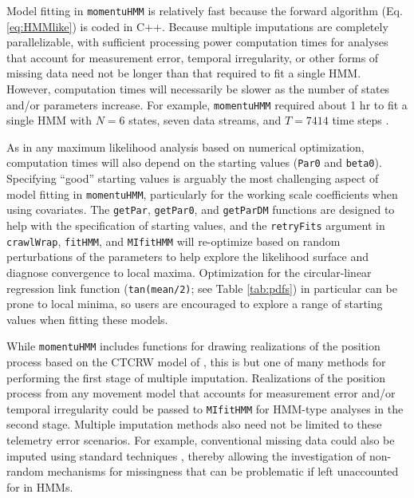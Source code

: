 \documentclass[12pt]{article}\usepackage[]{graphicx}\usepackage[]{color}
\begin{document}
Model fitting in \verb|momentuHMM| is relatively fast because the forward algorithm (Eq. \ref{eq:HMMlike}) is coded in C++. Because multiple imputations are completely parallelizable, with sufficient processing power computation times for analyses that account for measurement error, temporal irregularity, or other forms of missing data need not be longer than that required to fit a single HMM.  However, computation times will necessarily be slower as the number of states and/or parameters increase. For example, \verb|momentuHMM| required about 1 hr to fit a single HMM with $N=6$ states, seven data streams, and $T=7414$ time steps \citep{McClintock2017}. 

As in any maximum likelihood analysis based on numerical optimization, computation times will also depend on the starting values (\verb|Par0| and \verb|beta0|). Specifying ``good'' starting values is arguably the most challenging aspect of model fitting in \verb|momentuHMM|, particularly for the working scale coefficients when using covariates. The \verb|getPar|, \verb|getPar0|, and \verb|getParDM| functions are designed to help with the specification of starting values, and the \verb|retryFits| argument in \verb|crawlWrap|, \verb|fitHMM|, and \verb|MIfitHMM| will re-optimize based on random perturbations of the parameters to help explore the likelihood surface and diagnose convergence to local maxima. Optimization for the circular-linear regression link function (\verb|tan(mean/2)|; see Table \ref{tab:pdfs}) in particular can be prone to local minima, so users are encouraged to explore a range of starting values when fitting these models.

While \verb|momentuHMM| includes functions for drawing realizations of the position process based on the CTCRW model of \cite{JohnsonEtAl2008}, this is but one of many methods for performing the first stage of multiple imputation. Realizations of the position process from any movement model that accounts for measurement error and/or temporal irregularity \citep[e.g.][]{CalabreseEtAl2016,GurarieEtAl2017} could be passed to \verb|MIfitHMM| for HMM-type analyses in the second stage. Multiple imputation methods also need not be limited to these telemetry error scenarios. For example, conventional missing data could also be imputed using standard techniques \citep{RubinSchenker1986}, thereby allowing the investigation of non-random mechanisms for missingness that can be problematic if left unaccounted for in HMMs.
\end{document}
